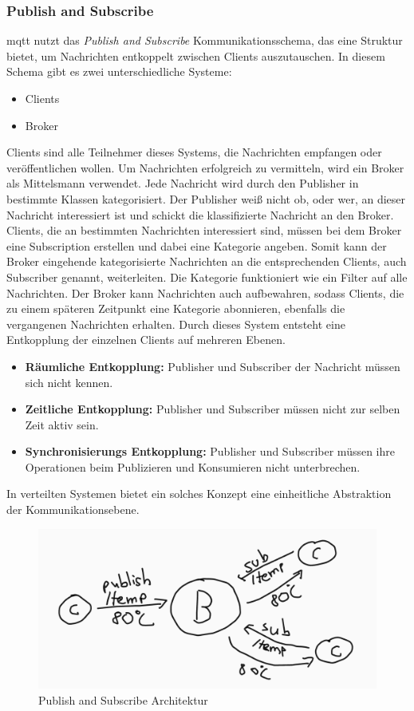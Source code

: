 \subsubsection{Publish and Subscribe} \label{s:publish-subscribe}
\ac{mqtt} nutzt das \textit{Publish and Subscribe} Kommunikationsschema, das eine Struktur bietet, um Nachrichten entkoppelt zwischen Clients auszutauschen. In diesem Schema gibt es zwei unterschiedliche Systeme:
\begin{itemize}
    \item Clients
    \item Broker
\end{itemize}
Clients sind alle Teilnehmer dieses Systems, die Nachrichten empfangen oder veröffentlichen wollen. Um Nachrichten erfolgreich zu vermitteln, wird ein Broker als Mittelsmann verwendet.\cite{teamGettingStartedMQTT}
Jede Nachricht wird durch den Publisher in bestimmte Klassen kategorisiert. Der Publisher wei{\ss} nicht ob, oder wer, an dieser Nachricht interessiert ist und schickt die klassifizierte Nachricht an den Broker.
Clients, die an bestimmten Nachrichten interessiert sind, müssen bei dem Broker eine Subscription erstellen und dabei eine Kategorie angeben.
Somit kann der Broker eingehende kategorisierte Nachrichten an die entsprechenden Clients, auch Subscriber genannt, weiterleiten. Die Kategorie funktioniert wie ein Filter auf alle Nachrichten.
Der Broker kann Nachrichten auch aufbewahren, sodass Clients, die zu einem späteren Zeitpunkt eine Kategorie abonnieren, ebenfalls die vergangenen Nachrichten erhalten.
\cite{EverythingYouNeed}
Durch dieses System entsteht eine Entkopplung der einzelnen Clients auf mehreren Ebenen.
\begin{itemize}
    \item \textbf{Räumliche Entkopplung:} Publisher und Subscriber der Nachricht müssen sich nicht kennen.
    \item \textbf{Zeitliche Entkopplung:} Publisher und Subscriber müssen nicht zur selben Zeit aktiv sein.
    \item \textbf{Synchronisierungs Entkopplung:} Publisher und Subscriber müssen ihre Operationen beim Publizieren und Konsumieren nicht unterbrechen.
\end{itemize}
\cite{teamPublishSubscribeMQTT}
In verteilten Systemen bietet ein solches Konzept eine einheitliche Abstraktion der Kommunikationsebene.
\cite{domingusDistributedSystemsIntroduction2020}
\begin{figure}
    \centering
    \includegraphics[scale=0.5]{images/publish_subscribe.png}
    \caption{Publish and Subscribe Architektur}
    \label{fig:publish-subscribe}
\end{figure}
